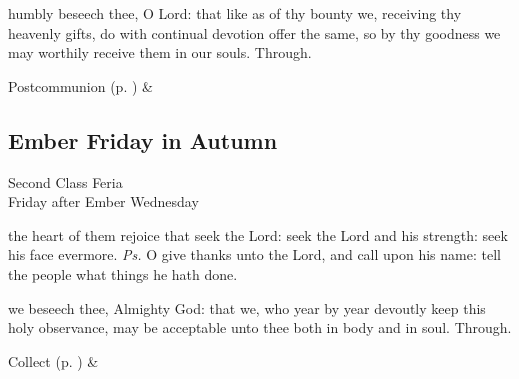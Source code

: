 
\vspace{-0.25\baselineskip}

\postcommunion

\vspace{-0.1\baselineskip}

 humbly beseech thee, O Lord: that like as of thy bounty we, receiving thy heavenly gifts, do with continual devotion offer the same, so by thy goodness we may worthily receive them in our souls. Through.
\begin{rubric}
     Postcommunion  (p. \pageref{SPSaints}) \&  
\end{rubric}


\subsection{Ember Friday in Autumn}
\begin{inhead}
    {Second Class Feria\\
Friday after Ember Wednesday}
\end{inhead}

\vspace{-0.25\baselineskip}

\introit

\vspace{-0.1\baselineskip}

 the heart of them rejoice that seek the Lord: seek the Lord and his strength: seek his face evermore. \textit{Ps.} O give thanks unto the Lord, and call upon his name: tell the people what things he hath done.

\vspace{-0.25\baselineskip}

\collect

\vspace{-0.1\baselineskip}

 we beseech thee, Almighty God: that we, who year by year devoutly keep this holy observance, may be acceptable unto thee both in body and in soul. Through.
\begin{rubric}
     Collect  (p. \pageref{SPSaints}) \&  
\end{rubric}


